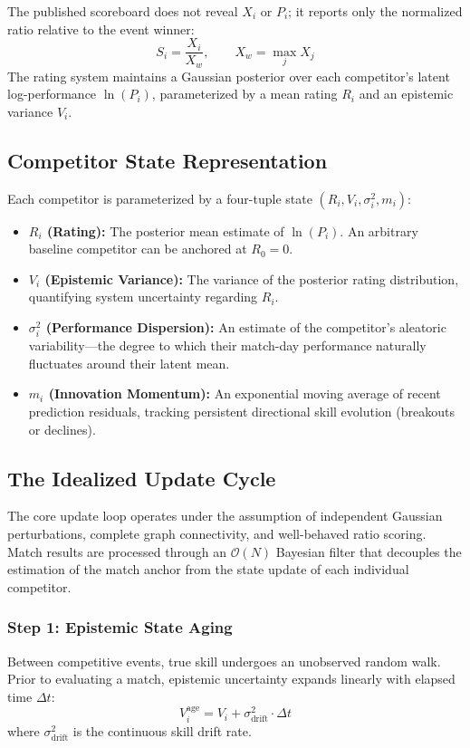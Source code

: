\documentclass[12pt]{article}
\newcommand{\sigmai}{\sigma_i^2}
\newcommand{\sdrift}{\sigma_{\mathrm{drift}}^2}
\newcommand{\xwin}{X_w}
\begin{document}
	The published scoreboard does not reveal $X_i$ or $P_i$; it reports only the normalized ratio relative to the event winner:
	\begin{equation}
		S_i = \frac{X_i}{\xwin}, \qquad \xwin = \max_{j} X_j
	\end{equation}
	The rating system maintains a Gaussian posterior over each competitor's latent log-performance $\ln(P_i)$, parameterized by a mean rating $R_i$ and an epistemic variance $V_i$.
	
	\subsection{Competitor State Representation}
	Each competitor is parameterized by a four-tuple state $(R_i, V_i, \sigmai, m_i)$:
	\begin{itemize}
		\item \textbf{$R_i$ (Rating):} The posterior mean estimate of $\ln(P_i)$. An arbitrary baseline competitor can be anchored at $R_0 = 0$.
		\item \textbf{$V_i$ (Epistemic Variance):} The variance of the posterior rating distribution, quantifying system uncertainty regarding $R_i$.
		\item \textbf{$\sigmai$ (Performance Dispersion):} An estimate of the competitor's aleatoric variability—the degree to which their match-day performance naturally fluctuates around their latent mean.
		\item \textbf{$m_i$ (Innovation Momentum):} An exponential moving average of recent prediction residuals, tracking persistent directional skill evolution (breakouts or declines).
	\end{itemize}
	
	\subsection{The Idealized Update Cycle}
	The core update loop operates under the assumption of independent Gaussian perturbations, complete graph connectivity, and well-behaved ratio scoring. Match results are processed through an $\mathcal{O}(N)$ Bayesian filter that decouples the estimation of the match anchor from the state update of each individual competitor.
	
	\subsubsection*{Step 1: Epistemic State Aging}
	Between competitive events, true skill undergoes an unobserved random walk. Prior to evaluating a match, epistemic uncertainty expands linearly with elapsed time $\Delta t$:
	\begin{equation}
		V_i^{\mathrm{age}} = V_i + \sdrift \cdot \Delta t
	\end{equation}
	where $\sdrift$ is the continuous skill drift rate.
	
\end{document}
